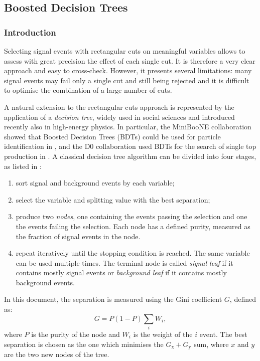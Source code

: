 \subsection{Boosted Decision Trees}\label{sec:bdt}
\subsubsection*{Introduction}
Selecting signal events with rectangular cuts on meaningful variables allows to assess with great precision the effect of each single cut. It is therefore a very clear approach and easy to cross-check. However, it presents several limitations: many signal events may fail only a single cut and still being rejected and it is difficult to optimise the combination of a large number of cuts. 

A natural extension to the rectangular cuts approach is represented by the application of a \emph{decision tree}, widely used in social sciences and introduced recently also in high-energy physics. In particular, the MiniBooNE collaboration showed that Boosted Decision Trees (BDTs) could be used for particle identification in \cite{Yang:2005nz}, and the D0 collaboration used BDTs for the search of single top production in \cite{Abazov:2006gd}.
A classical decision tree algorithm can be divided into four stages, as listed in \cite{Coadou:2013lca}:
\begin{enumerate}
    \item sort signal and background events by each variable;
    \item select the variable and splitting value with the best separation;
    \item produce two \emph{nodes}, one containing the events passing the selection and one the events failing the selection. Each node has a defined purity, measured as the fraction of signal events in the node.
    \item repeat iteratively until the stopping condition is reached. The same variable can be used multiple times. The terminal node is called \emph{signal leaf} if it contains mostly signal events or \emph{background leaf} if it contains mostly background events.
\end{enumerate}

In this document, the separation is measured using the Gini coefficient $G$, defined as:
\begin{equation}
    G = P(1-P)\sum_i W_i,
\end{equation}
where $P$ is the purity of the node and $W_i$ is the weight of the $i$ event. The best separation is chosen as the one which minimises the $G_{\mathrm{x}}+G_{\mathrm{y}}$ sum, where $x$ and $y$ are the two new nodes of the tree.

